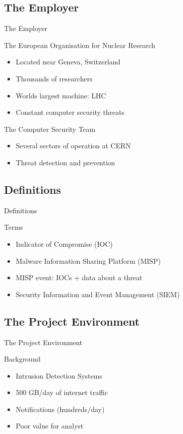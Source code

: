 \documentclass{beamer}
\begin{document}
\subsection{The Employer}
\begin{frame}{The Employer}

\begin{block}{The European Organisation for Nuclear Research}
\begin{itemize}
    \item Located near Geneva, Switzerland
    \item Thousands of researchers
    \item Worlds largest machine: LHC
    \item Constant computer security threats
\end{itemize}
\end{block}

\begin{block}{The Computer Security Team}
\begin{itemize}
    \item Several sectors of operation at CERN
    \item Threat detection and prevention
\end{itemize}
\end{block}
\end{frame}


\subsection{Definitions}
\begin{frame}{Definitions}
\begin{block}{Terms}
\begin{itemize}
    \item Indicator of Compromise (IOC)
    \item Malware Information Sharing Platform (MISP)
    \item MISP event: IOCs + data about a threat
    \item Security Information and Event Management (SIEM)
\end{itemize}
\end{block}
\end{frame}


\subsection{The Project Environment}
\begin{frame}{The Project Environment}
\begin{block}{Background}
\begin{itemize}
    \item Intrusion Detection Systems
    \item 500 GB/day of internet traffic
    \item Notifications (hundreds/day)
    \item Poor value for analyst
\end{itemize}
\end{block}
\end{frame}
\end{document}

